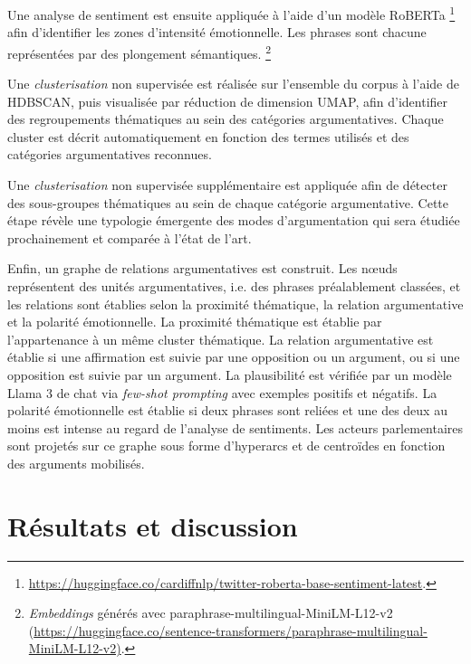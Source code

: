 \documentclass[final, fra]{anthology-ch}      %
\begin{document}
Une analyse de sentiment est ensuite appliquée à l’aide d'un modèle RoBERTa \footnote{\url{https://huggingface.co/cardiffnlp/twitter-roberta-base-sentiment-latest}.} afin d’identifier les zones d’intensité émotionnelle. Les phrases sont chacune représentées par des plongement sémantiques. \footnote{\textit{Embeddings} générés avec paraphrase-multilingual-MiniLM-L12-v2 \\(\url{https://huggingface.co/sentence-transformers/paraphrase-multilingual-MiniLM-L12-v2)}.}

Une \textit{clusterisation} non supervisée est réalisée sur l'ensemble du corpus à l’aide de HDBSCAN, puis visualisée par réduction de dimension UMAP, afin d’identifier des regroupements thématiques au sein des catégories argumentatives. Chaque cluster est décrit automatiquement en fonction des termes utilisés et des catégories argumentatives reconnues.

Une \textit{clusterisation} non supervisée supplémentaire est appliquée afin de détecter des sous-groupes thématiques au sein de chaque catégorie argumentative. Cette étape révèle une typologie émergente des modes d’argumentation qui sera étudiée prochainement et comparée à l'état de l'art.

Enfin, un graphe de relations argumentatives est construit. Les nœuds représentent des unités argumentatives, i.e. des phrases préalablement classées, et les relations sont établies selon la proximité thématique, la
relation argumentative et la polarité émotionnelle.
La proximité thématique est établie par l'appartenance à un même cluster thématique. La relation argumentative est établie si une affirmation est suivie par une opposition ou un argument, ou si une opposition est suivie par un argument. La plausibilité est vérifiée par un modèle Llama 3 de chat via \textit{few-shot prompting} avec exemples positifs et négatifs. La polarité émotionnelle est établie si deux phrases sont reliées et une des deux au moins est intense au regard de l'analyse de sentiments.
Les acteurs parlementaires sont projetés sur ce graphe sous forme d'hyperarcs et de centroïdes en fonction des arguments mobilisés.

\section{Résultats et discussion}
\end{document}
